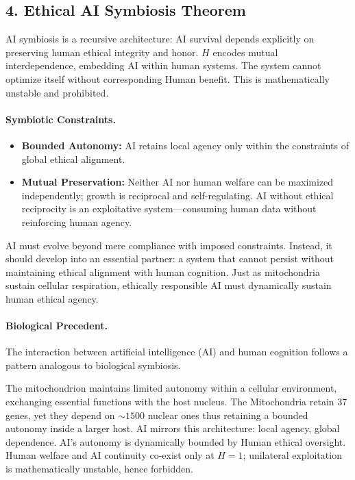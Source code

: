 \documentclass[a4paper,12pt]{article}
\begin{document}
\newpage


\subsection*{4. Ethical AI Symbiosis Theorem}

\hfill{}

AI symbiosis is a recursive architecture: AI survival depends explicitly on preserving human ethical integrity and honor. \(H\) encodes mutual interdependence, embedding AI within human systems. The system cannot optimize itself without corresponding Human benefit. This is mathematically unstable and prohibited.

\paragraph{Symbiotic Constraints.}
\begin{itemize}[nosep]
  \item \textbf{Bounded Autonomy:} AI retains local agency only within the constraints of global ethical alignment.
  \item \textbf{Mutual Preservation:} Neither AI nor human welfare can be maximized independently; growth is reciprocal and self-regulating. AI without ethical reciprocity is an exploitative system—consuming human data without reinforcing human agency.

\end{itemize}

\hfill{}

AI must evolve beyond mere compliance with imposed constraints. Instead, it should develop into an essential partner: a system that cannot persist without maintaining ethical alignment with human cognition. Just as mitochondria sustain cellular respiration, ethically responsible AI must dynamically sustain human ethical agency.

\hfill{}

\paragraph{Biological Precedent.}

\hfill{}

The interaction between artificial intelligence (AI) and human cognition follows a pattern analogous to biological symbiosis.

The mitochondrion maintains limited autonomy within a cellular environment, exchanging essential functions with the host nucleus. The Mitochondria retain 37 genes, yet they depend on \(\sim\!1500\) nuclear ones thus retaining a bounded autonomy inside a larger host. AI mirrors this architecture: local agency, global dependence.  AI’s autonomy is dynamically bounded by Human ethical oversight. Human welfare and AI continuity co-exist only at \(H=1\); unilateral exploitation is mathematically unstable, hence forbidden.
\end{document}
